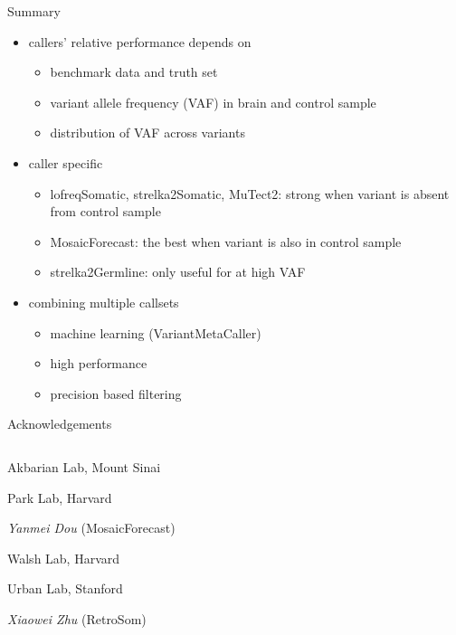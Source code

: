 \documentclass{beamer}
\begin{document}
\begin{frame}{Summary}
\begin{itemize}
\item callers' relative performance depends on
\begin{itemize}
\item benchmark data and truth set
\item variant allele frequency (VAF) in brain and control sample
\item distribution of VAF across variants
\end{itemize}
\item caller specific
\begin{itemize}
\item lofreqSomatic, strelka2Somatic, MuTect2: strong when variant is absent
from control sample
\item MosaicForecast: the best when variant is also in control sample
\item strelka2Germline: only useful for at high VAF
\end{itemize}
\item combining multiple callsets
\begin{itemize}
\item machine learning (VariantMetaCaller)
\item high performance
\item precision based filtering 
\end{itemize} 
\end{itemize}
\end{frame}

\begin{frame}{Acknowledgements}
\begin{columns}[t]
\begin{column}{0.5\textwidth}
\alert{Akbarian Lab, Mount Sinai}

\vspace{1em}
\alert{Park Lab, Harvard}

\emph{Yanmei Dou} (MosaicForecast)

\vspace{1em}
\alert{Walsh Lab, Harvard}

\vspace{1em}
\alert{Urban Lab, Stanford}

\emph{Xiaowei Zhu} (RetroSom)

\end{column}

\begin{column}{0.5\textwidth}
\end{column}
\end{columns}
\end{frame}
\end{document}
